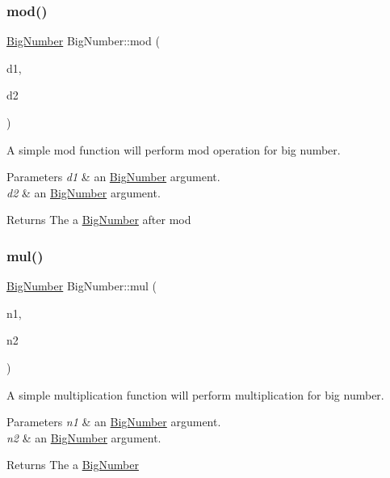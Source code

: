 \subsubsection{\texorpdfstring{mod()}{mod()}}
{\footnotesize\ttfamily \mbox{\hyperlink{class_big_number}{Big\+Number}} Big\+Number\+::mod (\begin{DoxyParamCaption}\item[{\mbox{\hyperlink{class_big_number}{Big\+Number}}}]{d1,  }\item[{\mbox{\hyperlink{class_big_number}{Big\+Number}}}]{d2 }\end{DoxyParamCaption})}



A simple mod function will perform mod operation for big number. 


\begin{DoxyParams}{Parameters}
{\em d1} & an \mbox{\hyperlink{class_big_number}{Big\+Number}} argument. \\
\hline
{\em d2} & an \mbox{\hyperlink{class_big_number}{Big\+Number}} argument. \\
\hline
\end{DoxyParams}
\begin{DoxyReturn}{Returns}
The a \mbox{\hyperlink{class_big_number}{Big\+Number}} after mod 
\end{DoxyReturn}
\mbox{\label{class_big_number_aee00ad35f3dd644131f6a54aef4908ce}} 
\subsubsection{\texorpdfstring{mul()}{mul()}}
{\footnotesize\ttfamily \mbox{\hyperlink{class_big_number}{Big\+Number}} Big\+Number\+::mul (\begin{DoxyParamCaption}\item[{\mbox{\hyperlink{class_big_number}{Big\+Number}}}]{n1,  }\item[{\mbox{\hyperlink{class_big_number}{Big\+Number}}}]{n2 }\end{DoxyParamCaption})}



A simple multiplication function will perform multiplication for big number. 


\begin{DoxyParams}{Parameters}
{\em n1} & an \mbox{\hyperlink{class_big_number}{Big\+Number}} argument. \\
\hline
{\em n2} & an \mbox{\hyperlink{class_big_number}{Big\+Number}} argument. \\
\hline
\end{DoxyParams}
\begin{DoxyReturn}{Returns}
The a \mbox{\hyperlink{class_big_number}{Big\+Number}} 
\end{DoxyReturn}
\mbox{\label{class_big_number_a19152e51454949e710abfa32d9ecdea4}} 
